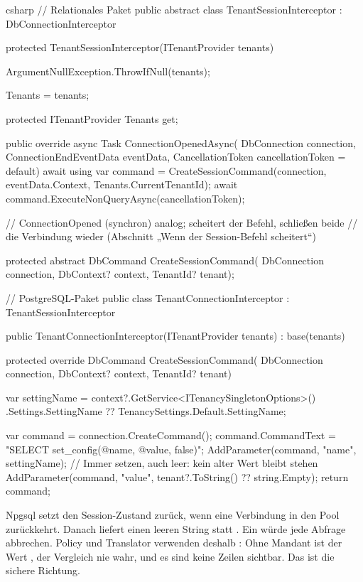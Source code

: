 \begin{sourcecode}{csharp}
// Relationales Paket
public abstract class TenantSessionInterceptor : DbConnectionInterceptor
{
    protected TenantSessionInterceptor(ITenantProvider tenants)
    {
        ArgumentNullException.ThrowIfNull(tenants);

        Tenants = tenants;
    }

    protected ITenantProvider Tenants { get; }

    public override async Task ConnectionOpenedAsync(
        DbConnection connection, ConnectionEndEventData eventData,
        CancellationToken cancellationToken = default)
    {
        await using var command =
            CreateSessionCommand(connection, eventData.Context, Tenants.CurrentTenantId);
        await command.ExecuteNonQueryAsync(cancellationToken);
    }

    // ConnectionOpened (synchron) analog; scheitert der Befehl, schließen beide
    // die Verbindung wieder (Abschnitt „Wenn der Session-Befehl scheitert“)

    protected abstract DbCommand CreateSessionCommand(
        DbConnection connection, DbContext? context, TenantId? tenant);
}

// PostgreSQL-Paket
public class TenantConnectionInterceptor : TenantSessionInterceptor
{
    public TenantConnectionInterceptor(ITenantProvider tenants)
        : base(tenants)
    {
    }

    protected override DbCommand CreateSessionCommand(
        DbConnection connection, DbContext? context, TenantId? tenant)
    {
        var settingName = context?.GetService<ITenancySingletonOptions>()
                              .Settings.SettingName
                          ?? TenancySettings.Default.SettingName;

        var command = connection.CreateCommand();
        command.CommandText = "SELECT set_config(@name, @value, false)";
        AddParameter(command, "name", settingName);
        // Immer setzen, auch leer: kein alter Wert bleibt stehen
        AddParameter(command, "value", tenant?.ToString() ?? string.Empty);
        return command;
    }
}
\end{sourcecode}

\begin{note}
  Npgsql setzt den Session-Zustand zurück, wenn eine Verbindung in den Pool zurückkehrt.
  Danach liefert
   einen leeren String statt . Ein  würde jede Abfrage
  abbrechen. Policy und Translator verwenden deshalb
  :
  Ohne Mandant ist der Wert , der Vergleich nie wahr, und es sind keine Zeilen
  sichtbar. Das ist die sichere Richtung.
\end{note}

